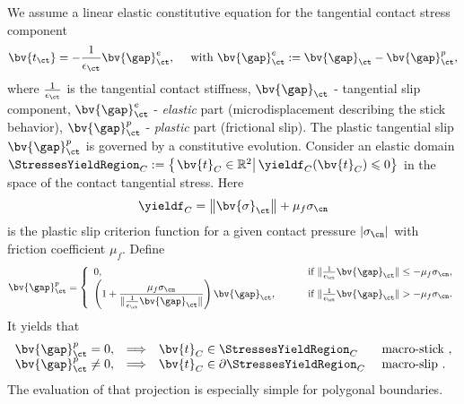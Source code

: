 We assume a linear elastic constitutive equation for the tangential contact stress component
\begin{equation*}
\bv{t_{\ct}}=-{\frac{1}{\epsilon_{\ct}}} \bv{\gap}^e_{\ct},\quad \mbox{ with } \bv{\gap}_{\ct}^e:=\bv{\gap}_{\ct}-\bv{\gap}^p_{\ct},
\end{equation*}
where ${\frac{1}{\epsilon_{\ct}}}$ is the tangential contact stiffness, 
$\bv{\gap}_{\ct}$ - tangential slip component,  
$\bv{\gap}^e_{\ct}$ - \textit{elastic} part (microdisplacement describing the stick behavior), $\bv{\gap}^p_{\ct}$ - \textit{plastic} part (frictional slip). The plastic tangential slip $\bv{\gap}^p_{\ct}$ is governed by a constitutive evolution. Consider an elastic domain 
$ \StressesYieldRegion_{C}:=\left\{\left. \bv{t}_{C}\in  \mathbb{R}^2\right|\yieldf_{C}(\bv{t}_{C})\leqslant0\right\}$ in the space of the contact tangential stress. Here
\begin{equation*}
\yieldf_{C}=\left\| \bv{\sigma}_{\ct} \right\|+ \mu_f \sigma_{\cn}
\end{equation*}
is the plastic slip criterion function for a given contact pressure $|\sigma_{\cn}|$ with friction coefficient $\mu_f$. Define
\begin{equation*}
\bv{\gap}^p_{\ct}=
 \left\lbrace 
  \begin{array}{ll} 
  0, & \mbox{ if } \Vert {\frac{1}{\epsilon_{\ct}}} \bv{\gap}_{\ct} \Vert \leq -\mu_f \sigma_{\cn}, \\
  \left( 1 + \dfrac{\mu_f \sigma_{\cn}}{\Vert {\frac{1}{\epsilon_{\ct}}} \bv{\gap}_{\ct} \Vert} \right) \bv{\gap}_{\ct},  \qquad
  & \mbox{ if } \Vert {\frac{1}{\epsilon_{\ct}}} \bv{\gap}_{\ct} \Vert >  - \mu_f \sigma_{\cn}.
  \end{array}
 \right. 
\end{equation*}
It yields that
\begin{equation*}
\begin{array}{ccll} 
  \bv{\gap}_{\ct}^p = 0, & \Longrightarrow & \bv{t}_{C} \in \StressesYieldRegion_{C} & \mbox{ macro-stick },\\
  \bv{\gap}_{\ct}^p \neq 0, & \Longrightarrow & \bv{t}_{C} \in \partial \StressesYieldRegion_{C} & \mbox{ macro-slip }.  
  \end{array}
\end{equation*}
The evaluation of that projection is especially simple for polygonal boundaries.



